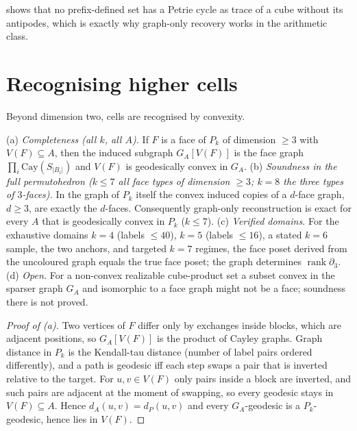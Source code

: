  shows that no prefix-defined set has a Petrie cycle as trace of a cube without its antipodes, which is exactly why graph-only recovery works in the arithmetic class.

\section{Recognising higher cells}
Beyond dimension two, cells are recognised by convexity.
\begin{theorem}\label{thm:face-recognition}
(a) \emph{Completeness (all $k$, all $A$).} If $F$ is a face of $P_k$ of dimension $\ge3$ with $V(F)\subseteq A$, then the induced subgraph $G_A[V(F)]$ is the face graph $\prod_i\mathrm{Cay}(S_{|B_i|})$ and $V(F)$ is geodesically convex in $G_A$.
(b) \emph{Soundness in the full permutohedron ($k\le7$ all face types of dimension $\ge3$; $k=8$ the three types of $3$-faces).} In the graph of $P_k$ itself the convex induced copies of a $d$-face graph, $d\ge3$, are exactly the $d$-faces. Consequently graph-only reconstruction is exact for every $A$ that is geodesically convex in $P_k$ ($k\le7$).
(c) \emph{Verified domains.} For the exhaustive domains $k=4$ (labels $\le40$), $k=5$ (labels $\le16$), a stated $k=6$ sample, the two anchors, and targeted $k=7$ regimes, the face poset derived from the uncoloured graph equals the true face poset; the graph determines $\operatorname{rank}\partial_3$.
(d) \emph{Open.} For a non-convex realizable cube-product set a subset convex in the sparser graph $G_A$ and isomorphic to a face graph might not be a face; soundness there is not proved.
\end{theorem}
\begin{proof}[Proof of (a)]
Two vertices of $F$ differ only by exchanges inside blocks, which are adjacent positions, so $G_A[V(F)]$ is the product of Cayley graphs. Graph distance in $P_k$ is the Kendall-tau distance (number of label pairs ordered differently), and a path is geodesic iff each step swaps a pair that is inverted relative to the target. For $u,v\in V(F)$ only pairs inside a block are inverted, and such pairs are adjacent at the moment of swapping, so every geodesic stays in $V(F)\subseteq A$. Hence $d_A(u,v)=d_P(u,v)$ and every $G_A$-geodesic is a $P_k$-geodesic, hence lies in $V(F)$.
\end{proof}
